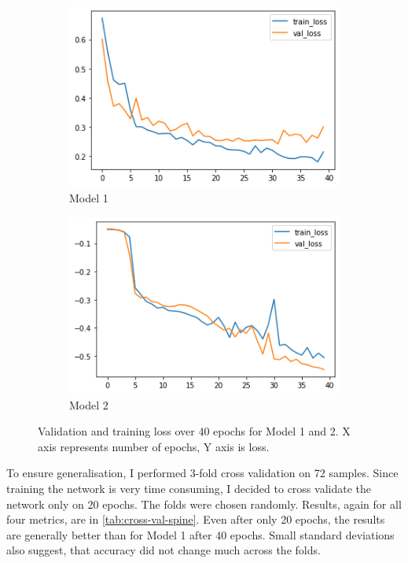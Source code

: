 \begin{figure}
\begin{subfigure}{.5\textwidth}
  \centering
  \includegraphics[width=.8\linewidth]{images/loss-binary.png}
  \caption{Model 1}
  \label{fig:sfig1}
\end{subfigure}%
\begin{subfigure}{.5\textwidth}
  \centering
  \includegraphics[width=.8\linewidth]{images/loss-dice.png}
  \caption{Model 2}
  \label{fig:sfig2}
\end{subfigure}
\caption[Loss over epochs for Model 1 and 2]{Validation and training loss over 40 epochs for Model 1 and 2. X axis represents number of epochs, Y axis is loss.}
\label{fig:spine-losses}
\end{figure}


To ensure generalisation, I performed 3-fold cross validation on 72 samples. Since training the network is very time consuming, I decided to cross validate the network only on 20 epochs. The folds were chosen randomly. Results, again for all four metrics, are in \ref{tab:cross-val-spine}. Even after only 20 epochs, the results are generally better than for Model 1 after 40 epochs. Small standard deviations also suggest, that accuracy did not change much across the folds.


